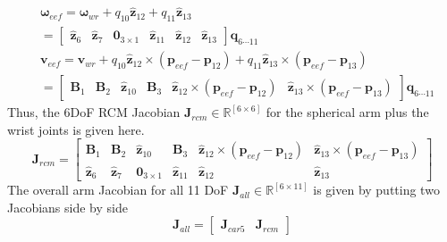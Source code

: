\documentclass{article}
\begin{document}
\begin{equation}
\begin{split}
&\boldsymbol{\omega}_{eef} = \boldsymbol{\omega}_{wr} + q_{10} \hat{\mathbf{z}}_{12} + q_{11} \hat{\mathbf{z}}_{13} \\
&= \begin{bmatrix}\hat{\mathbf{z}}_6 & \hat{\mathbf{z}}_7 & \mathbf{0}_{3\times1} & \hat{\mathbf{z}}_{11} & \hat{\mathbf{z}}_{12} & \hat{\mathbf{z}}_{13} \end{bmatrix} \mathbf{q}_{6\cdots11}\\
&\mathbf{v}_{eef} = \mathbf{v}_{wr} +  q_{10} \hat{\mathbf{z}}_{12}\times(\mathbf{p}_{eef} - \mathbf{p}_{12}) + q_{11} \hat{\mathbf{z}}_{13}\times(\mathbf{p}_{eef} - \mathbf{p}_{13})\\
&=  \begin{bmatrix}\mathbf{B}_1 & \mathbf{B}_2 & \hat{\mathbf{z}}_{10} & \mathbf{B}_3 & \hat{\mathbf{z}}_{12}\times(\mathbf{p}_{eef} - \mathbf{p}_{12}) & \hat{\mathbf{z}}_{13}\times(\mathbf{p}_{eef} - \mathbf{p}_{13}) \end{bmatrix} \mathbf{q}_{6\cdots11}
\end{split}
\end{equation}
Thus, the 6DoF RCM Jacobian $\mathbf{J}_{rcm} \in \mathbb{R}^{[6\times6]}$ for the spherical arm plus the wrist joints is given here.
\begin{equation}
\mathbf{J}_{rcm} =  \begin{bmatrix} \mathbf{B}_1 & \mathbf{B}_2 & \hat{\mathbf{z}}_{10} & \mathbf{B}_3 & \hat{\mathbf{z}}_{12}\times(\mathbf{p}_{eef} - \mathbf{p}_{12}) & \hat{\mathbf{z}}_{13}\times(\mathbf{p}_{eef} - \mathbf{p}_{13})\\
						\hat{\mathbf{z}}_6 & \hat{\mathbf{z}}_7 & \mathbf{0}_{3\times1} & \hat{\mathbf{z}}_{11} & \hat{\mathbf{z}}_{12} & \hat{\mathbf{z}}_{13}\end{bmatrix}
\end{equation}
The overall arm Jacobian for all 11 DoF $\mathbf{J}_{all} \in \mathbb{R}^{[6\times11]}$ is given by putting two Jacobians side by side
\begin{equation}
\mathbf{J}_{all} =  \begin{bmatrix} \mathbf{J}_{car5} & \mathbf{J}_{rcm} \end{bmatrix}
\end{equation}
\end{document}
